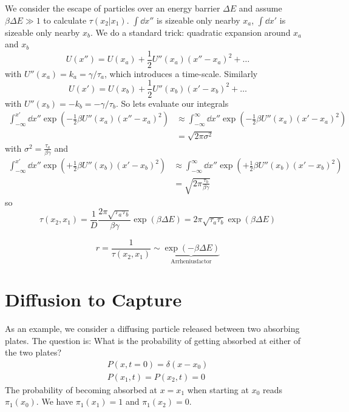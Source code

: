\documentclass{/home/ben/Templates/notebook}
\begin{document}
	We consider the escape of particles over an energy barrier $\Delta E$ and assume $\beta \Delta E \gg 1$ to calculate $\tau(x_2|x_1)$. $\int \dd{x''}$ is sizeable only nearby $x_a$, $\int \dd{x'}$ is sizeable only nearby $x_b$. We do a standard trick: quadratic expansion around $x_a$ and $x_b$
	\begin{equation}
	U(x'') = U(x_a) + \frac{1}{2} U''(x_a) (x''-x_a)^2 + \dots
	\end{equation}
	with $U''(x_a) = k_a = \gamma/\tau_a$, which introduces a time-scale. Similarly
	\begin{equation}
	U(x') = U(x_b) + \frac{1}{2} U''(x_b) (x'-x_b)^2 + \dots
	\end{equation}
	with $U''(x_b) = -k_b = -\gamma/\tau_b$. So lets evaluate our integrals
	\begin{align*}
		\int_{-\infty}^{x'} \dd{x''} \exp(-  \frac{1}{2} \beta U''(x_a) (x''-x_a)^2)
		&\approx \int_{-\infty}^{\infty} \dd{x''} \exp(-  \frac{1}{2} \beta U''(x_a) (x'-x_a)^2) \\ 
		&= \sqrt{2 \pi \sigma^2}
	\end{align*}
	with $\sigma^2 = \frac{\tau_a}{\beta \gamma}$ and
	\begin{align*}
		\int_{-\infty}^{x'} \dd{x''} \exp(+\frac{1}{2} \beta U''(x_b) (x'-x_b)^2)
		&\approx \int_{-\infty}^{\infty} \dd{x''} \exp(+\frac{1}{2} \beta U''(x_b) (x'-x_b)^2) \\ &= \sqrt{2 \pi \frac{\tau_b}{\beta \gamma}}
	\end{align*}
	so
	\begin{equation}
	\tau(x_2,x_1) = \frac{1}{D} \frac{2 \pi \sqrt{\tau_a \tau_b}}{\beta \gamma} \exp(\beta \Delta E) = 2 \pi \sqrt{\tau_a \tau_b} \exp(\beta \Delta E)
	\end{equation}
	\begin{theorem}
		\begin{equation}
		r = \frac{1}{\tau(x_2,x_1)} \sim \underbrace{\exp(-\beta \Delta E)}_{\mathrm{Arrhenius factor}}
		\end{equation}
	\end{theorem}
	
	\section{Diffusion to Capture}
	
	As an example, we consider a diffusing particle released between two absorbing plates. The question is: What is the probability of getting absorbed at either of the two plates?
	\begin{align*}
		P(x, t=0) = \delta(x-x_0) \\
		P(x_1, t) = P(x_2, t) = 0
	\end{align*}
	The probability of becoming absorbed at $x = x_1$ when starting at $x_0$ reads $\pi_1(x_0)$. We have $\pi_1(x_1) = 1$ and $\pi_1(x_2) = 0$.
	
\end{document}
